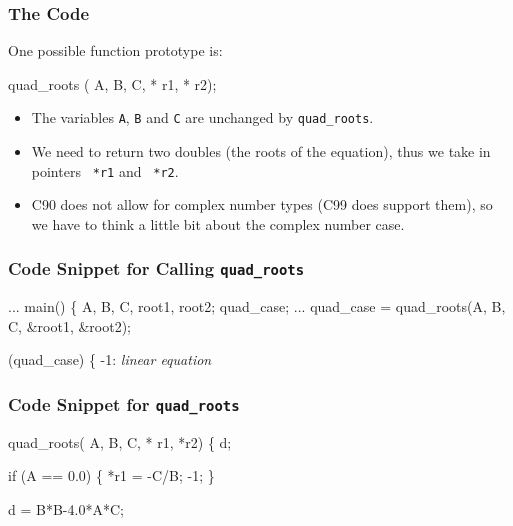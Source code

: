 \documentclass[smaller,table]{beamer}
\begin{document}
\begin{frame}[fragile]
\frametitle{The Code}
One possible function prototype is:
\begin{semiverbatim}
 quad_roots ( A,  B,  C,
                 * r1,  * r2);
\end{semiverbatim}
\begin{itemize}
\item The variables {\tt A}, {\tt B} and {\tt C} are unchanged by {\tt quad\_roots}.
\item We need to return two doubles (the roots of the equation), thus we take in pointers {\tt {} *r1} and {\tt {} *r2}.
\item C90 does not allow for complex number types (C99 does support them), so we have to think a little bit about the complex number case.
\end{itemize}
\end{frame}

\begin{frame}[fragile]
\frametitle{Code Snippet for Calling {\tt quad\_roots}}
\begin{semiverbatim}
...
 main()
\{
    A, B, C, root1, root2;
    quad_case;   
   ...   
   quad\_case = quad\_roots(A, B, C, \&root1,
                          \&root2);
                          
   (quad\_case)
   \{
    -1: \emph{linear equation}
\end{semiverbatim}
\end{frame}

\begin{frame}[fragile]
\frametitle{Code Snippet for {\tt quad\_roots}}
\begin{semiverbatim}
 quad\_roots( A,  B,  C,
                * r1,  *r2)
\{
    d;
   
   if (A == 0.0)
   \{
      *r1 = -C/B;
       -1;
   \}
          
   d = B*B-4.0*A*C;
\end{semiverbatim}
\end{frame}
\end{document}
